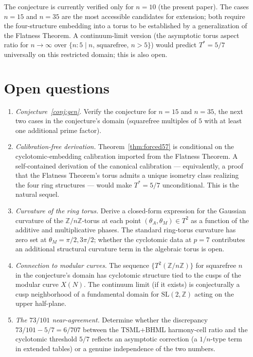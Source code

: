 \documentclass[11pt,reqno]{amsart}
\theoremstyle{plain}
\theoremstyle{definition}
\newcommand{\Z}{\mathbb{Z}}
\newcommand{\Zn}{\Z/n\Z}
\newcommand{\Tstar}{T^{*}}
\begin{document}
The conjecture is currently verified only for $n = 10$ (the present paper). The cases $n = 15$ and $n = 35$ are the most accessible candidates for extension; both require the four-structure embedding into a torus to be established by a generalization of the Flatness Theorem. A continuum-limit version (the asymptotic torus aspect ratio for $n \to \infty$ over $\{n : 5 \mid n, \, \text{squarefree}, \, n > 5\}$) would predict $\Tstar = 5/7$ universally on this restricted domain; this is also open.

\section{Open questions}

\begin{enumerate}[label=(\alph*)]
\item \emph{Conjecture~\ref{conj:gen}.} Verify the conjecture for $n = 15$ and $n = 35$, the next two cases in the conjecture's domain (squarefree multiples of $5$ with at least one additional prime factor).
\item \emph{Calibration-free derivation.} Theorem~\ref{thm:forced57} is conditional on the cyclotomic-embedding calibration imported from the Flatness Theorem. A self-contained derivation of the canonical calibration --- equivalently, a proof that the Flatness Theorem's torus admits a unique isometry class realizing the four ring structures --- would make $\Tstar = 5/7$ unconditional. This is the natural sequel.
\item \emph{Curvature of the ring torus.} Derive a closed-form expression for the Gaussian curvature of the $\Zn$-torus at each point $(\theta_A, \theta_M) \in T^2$ as a function of the additive and multiplicative phases. The standard ring-torus curvature has zero set at $\theta_M = \pi/2, 3\pi/2$; whether the cyclotomic data at $p = 7$ contributes an additional structural curvature term in the algebraic torus is open.
\item \emph{Connection to modular curves.} The sequence $\{T^2(\Zn)\}$ for squarefree $n$ in the conjecture's domain has cyclotomic structure tied to the cusps of the modular curve $X(N)$. The continuum limit (if it exists) is conjecturally a cusp neighborhood of a fundamental domain for $\mathrm{SL}(2,\Z)$ acting on the upper half-plane.
\item \emph{The $73/101$ near-agreement.} Determine whether the discrepancy $73/101 - 5/7 = 6/707$ between the TSML+BHML harmony-cell ratio and the cyclotomic threshold $5/7$ reflects an asymptotic correction (a $1/n$-type term in extended tables) or a genuine independence of the two numbers.
\end{enumerate}
\end{document}
